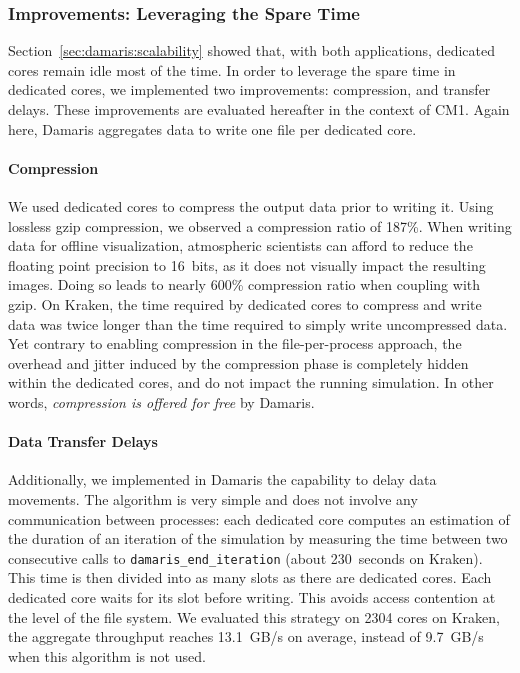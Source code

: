 \subsubsection{Improvements: Leveraging the Spare Time}

Section~\ref{sec:damaris:scalability} showed that, with both applications, 
dedicated cores remain idle most of the time.
In order to leverage the spare time in dedicated cores, we implemented two improvements:
compression, and transfer delays. These improvements are evaluated hereafter in the
context of CM1. Again here, Damaris aggregates data to write one file per dedicated core. 

\paragraph{Compression} 
We used dedicated cores to compress the output data prior to writing it.
Using lossless gzip compression, we observed a compression ratio of 187\%. 
When writing data for offline visualization, atmospheric scientists can afford to reduce the floating point precision
to 16~bits, as it does not visually impact the resulting images. 
Doing so leads to nearly 600\% compression ratio when coupling with gzip. 
On Kraken, the time required by dedicated cores to compress and write data was
twice longer than the time required to simply write uncompressed data. Yet 
contrary to enabling compression in the file-per-process 
approach, the overhead and jitter induced by the compression phase is 
completely hidden within the dedicated cores, and do not impact the running 
simulation. In other words, \emph{compression is offered for free} by Damaris.

\paragraph{Data Transfer Delays}
Additionally, we implemented in Damaris the capability to
delay data movements. The algorithm is very simple and does not involve any
communication between processes: each dedicated core computes
an estimation of the duration of an iteration of the simulation by measuring the time between
two consecutive calls to \texttt{damaris\_end\_iteration} (about 230~seconds on Kraken). 
This time is then divided into as many slots as there are dedicated cores. Each dedicated 
core waits for its slot before writing. This avoids access contention at the level 
of the file system. We evaluated this strategy on 2304 cores on Kraken, the aggregate 
throughput reaches 13.1~GB/s on average, instead of 9.7~GB/s when this 
algorithm is not used.

